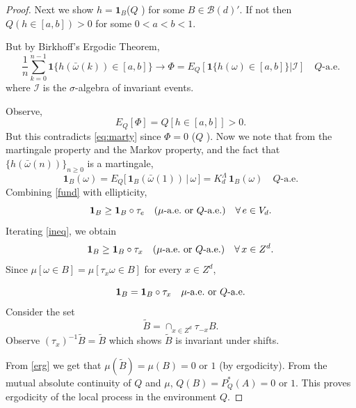 \documentclass[10pt,a4paper]{amsart}
\def\mathbb#1{#1}%
\begin{document}
\begin{proof}
Next we show $h = \boldsymbol{1}_B$($\mathbb{Q}$ ) for some $B \in \mathcal{B}(d)'$. If not then \\$\mathbb{Q}( h \in [a,b])>0$ for some $0<a<b<1$. 

But by Birkhoff's Ergodic Theorem, 
\[
\frac{1}{n} \sum_{k=0}^{n-1} \boldsymbol{1}\{h(\bar{\omega}(k))\in [a,b]\} \to \Phi= \mathbb{E}_{\mathbb{Q}}[ \boldsymbol{1}\{h(\omega)\in [a,b]\} | \mathcal{I} ]\quad\mathbb{Q}\text{-a.e.}
\]
where $\mathcal{I}$ is the $\sigma$-algebra of invariant events. 

Observe, 
\[
\mathbb{E}_{\mathbb{Q}} [\Phi] = \mathbb{Q}[h \in [a,b]]>0.
\]
But this contradicts \ref{eq:marty} since $\Phi =0 $ ($\mathbb{Q}$ ).
Now we note that from the martingale property and the Markov property, and the fact that $\{h(\bar{\omega}(n))\}_{n\geq0}$ is a martingale,
\begin{equation}\label{fund}
\boldsymbol{1}_{B}(\omega) 
  = \mathbb{E}_{\mathbb{Q}}\Big[\,\boldsymbol{1}_{B}(\bar{\omega}(1)) \,\big|\, \omega \,\Big]
  = K_d^{\Lambda} \,\boldsymbol{1}_{B}(\omega)
  \quad \mathbb{Q}\text{-a.e.}
\end{equation}
Combining \ref{fund} with ellipticity,
\begin{equation}{\label{ineq}}
\boldsymbol{1}_{B} \geq \boldsymbol{1}_{B} \circ \tau_e \quad (\mu\text{-\text{a.e.} or } \mathbb{Q}\text{-a.e.}) \quad \forall\, e \in {V}_d.
\end{equation}
Iterating \ref{ineq}, we obtain  
\[
\boldsymbol{1}_{B} \geq \boldsymbol{1}_{B} \circ \tau_x \quad (\mu\text{\text{-a.e.} or } \mathbb{Q}\text{\text{-a.e.}}) \quad \forall\, x \in \mathbb{Z}^d.
\]
Since $\mu[ \omega \in B] = \mu [\tau_{x}\omega\in B]$ for every $x \in \mathbb{Z}^d$, 

\begin{equation}{\label{erg}}
 \boldsymbol{1}_{B} = \boldsymbol{1}_{B} \circ \tau_x \quad \mu\text{\text{-a.e.} or}~\mathbb{Q}\text{\text{-a.e.}}
\end{equation}
Consider the set \[
\tilde{B} = \cap_{x \in \mathbb{Z}^d} \tau_{-x}B .
\] 
Observe $(\tau_x)^{-1} \tilde{B} = \tilde{B}$ which shows $\tilde{B}$ is invariant under shifts. 

From \ref{erg} we get that $ \mu(\tilde{B})= \mu(B) = 0$ or $1$ (by ergodicity). From the mutual absolute continuity of $\mathbb{Q}$ and $ \mu$, 
$\mathbb{Q}(B) =P^*_{\mathbb{Q}}(A)=0$ or $1$. This proves ergodicity of the local process in the environment $\mathbb{Q}$.
\end{proof}
\end{document}
